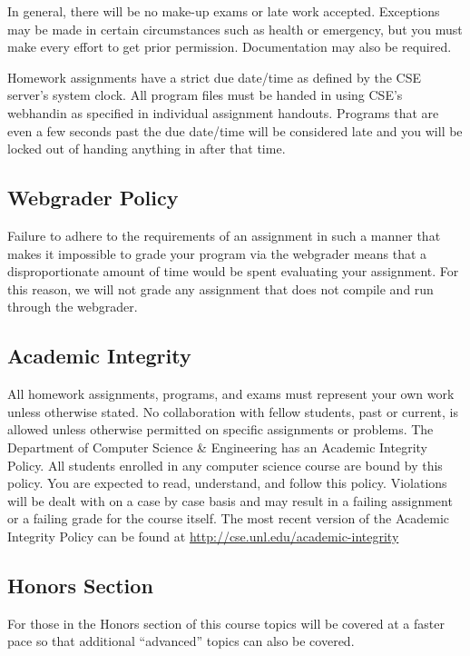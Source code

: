 \documentclass[12pt]{scrartcl}
\begin{document}

In general, there will be no make-up exams or late work
accepted.  Exceptions may be made in certain circumstances 
such as health or emergency, but you must make every effort 
to get prior permission.  Documentation may also be required.

Homework assignments have a strict due date/time as defined by
the CSE server's system clock.  All program files must be handed
in using CSE's webhandin as specified in individual assignment
handouts.  Programs that are even a few seconds past the due 
date/time will be considered late and you will be locked out
of handing anything in after that time.  

\subsection{Webgrader Policy}

Failure to adhere to the requirements of an assignment in such 
a manner that makes it impossible to grade your program via 
the webgrader means that a disproportionate amount of time 
would be spent evaluating your assignment.  For this reason, 
we will not grade any assignment that does not compile and 
run through the webgrader.  

\subsection{Academic Integrity}

All homework assignments, programs, and exams must represent
your own work unless otherwise stated.  No collaboration with 
fellow students, past or current, is allowed unless otherwise 
permitted on specific assignments or problems.  The Department of
Computer Science \& Engineering has an Academic Integrity Policy.  
All students enrolled in any computer science course are bound 
by this policy.  You are expected to read, understand, and follow 
this policy.  Violations will be dealt with on a case by case 
basis and may result in a failing assignment or a failing grade 
for the course itself.  The most recent version of the Academic 
Integrity Policy can be found at \url{http://cse.unl.edu/academic-integrity}

\subsection{Honors Section}

For those in the Honors section of this course topics will be 
covered at a faster pace so that additional ``advanced'' topics
can also be covered.  
\end{document}
